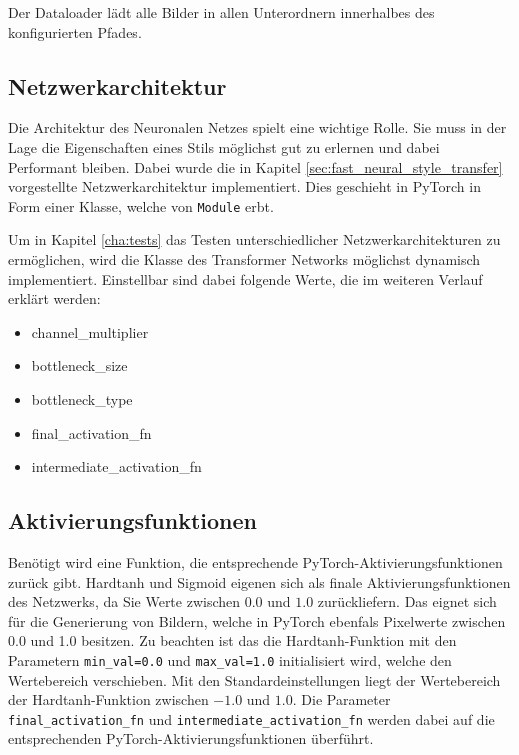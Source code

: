 Der Dataloader lädt alle Bilder in allen Unterordnern innerhalbes des konfigurierten Pfades.

\subsection{Netzwerkarchitektur}
\label{sec:network_architecture}

Die Architektur des Neuronalen Netzes spielt eine wichtige Rolle. Sie muss in der Lage die Eigenschaften eines Stils möglichst gut zu erlernen und dabei Performant bleiben. Dabei wurde die in Kapitel \ref{sec:fast_neural_style_transfer} vorgestellte Netzwerkarchitektur implementiert.
Dies geschieht in PyTorch in Form einer Klasse, welche von \texttt{Module} erbt.

Um in Kapitel \ref{cha:tests} das Testen unterschiedlicher Netzwerkarchitekturen zu ermöglichen, wird die Klasse des Transformer Networks möglichst dynamisch implementiert. Einstellbar sind dabei folgende Werte, die im weiteren Verlauf erklärt werden:

\begin{itemize}
    \item channel\_multiplier
    \item bottleneck\_size
    \item bottleneck\_type
    \item final\_activation\_fn
    \item intermediate\_activation\_fn
\end{itemize}

\subsection{Aktivierungsfunktionen}

Benötigt wird eine Funktion, die entsprechende PyTorch-Aktivierungsfunktionen zurück gibt. Hardtanh und Sigmoid eigenen sich als finale Aktivierungsfunktionen des Netzwerks, da Sie Werte zwischen $ 0.0 $ und $ 1.0 $ zurückliefern. Das eignet sich für die Generierung von Bildern, welche in PyTorch ebenfals Pixelwerte zwischen $ 0.0 $ und 1.0 besitzen. Zu beachten ist das die Hardtanh-Funktion mit den Parametern \texttt{min_val=0.0} und \texttt{max_val=1.0} initialisiert wird, welche den Wertebereich verschieben. Mit den Standardeinstellungen liegt der Wertebereich der Hardtanh-Funktion zwischen $ -1.0 $ und $ 1.0 $. Die Parameter \texttt{final_activation_fn} und \texttt{intermediate_activation_fn} werden dabei auf die entsprechenden PyTorch-Aktivierungsfunktionen überführt.

